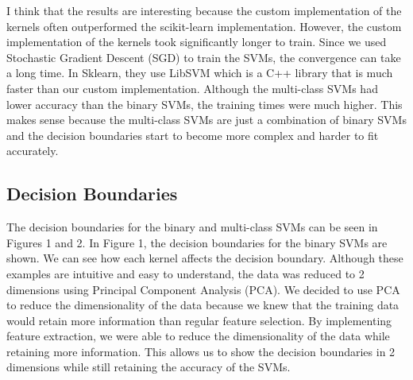\documentclass[12pt]{article}
\begin{document}
\FloatBarrier 
I think that the results are interesting because the custom implementation of the kernels often outperformed the scikit-learn implementation.
However, the custom implementation of the kernels took significantly longer to train. Since we used Stochastic Gradient Descent (SGD) to train the SVMs, 
the convergence can take a long time. In Sklearn, they use LibSVM which is a C++ library that is much faster than our custom implementation.
Although the multi-class SVMs had lower accuracy than the binary SVMs, the training times were much higher. This makes sense because the multi-class SVMs
are just a combination of binary SVMs and the decision boundaries start to become more complex and harder to fit accurately.
\FloatBarrier 
\subsection{Decision Boundaries}
The decision boundaries for the binary and multi-class SVMs can be seen in Figures 1 and 2.
In Figure 1, the decision boundaries for the binary SVMs are shown. We can see how each kernel affects the decision boundary.
Although these examples are intuitive and easy to understand, the data was reduced to 2 dimensions using Principal Component Analysis (PCA).
We decided to use PCA to reduce the dimensionality of the data because we knew that the training data would retain more information than 
regular feature selection. By implementing feature extraction, we were able to reduce the dimensionality of the data while retaining more information.
This allows us to show the decision boundaries in 2 dimensions while still retaining the accuracy of the SVMs.
\end{document}
